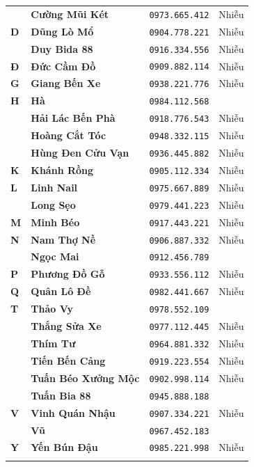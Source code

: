 \documentclass[12pt,a4paper]{article}
\begin{document}
\begin{xltabular}{\textwidth}{>{\hsize}X >{\hsize}X >{\hsize}X >{\hsize}X}
 & \textbf{Cường Mũi Két} & \texttt{0973.665.412} & Nhiễu \\ \addlinespace[4pt]
\textbf{D} & \textbf{Dũng Lò Mổ} & \texttt{0904.778.221} & Nhiễu \\ \addlinespace[4pt]
 & \textbf{Duy Bida 88} & \texttt{0916.334.556} & Nhiễu \\ \addlinespace[4pt]
\textbf{Đ} & \textbf{Đức Cầm Đồ} & \texttt{0909.882.114} & Nhiễu \\ \addlinespace[4pt]
\textbf{G} & \textbf{Giang Bến Xe} & \texttt{0938.221.776} & Nhiễu \\ \addlinespace[4pt]
\textbf{H} & \textbf{Hà} & \texttt{0984.112.568} &  \\ \addlinespace[4pt]
 & \textbf{Hải Lác Bến Phà} & \texttt{0918.776.543} & Nhiễu \\ \addlinespace[4pt]
 & \textbf{Hoàng Cắt Tóc} & \texttt{0948.332.115} & Nhiễu \\ \addlinespace[4pt]
 & \textbf{Hùng Đen Cửu Vạn} & \texttt{0936.445.882} & Nhiễu \\ \addlinespace[4pt]
\textbf{K} & \textbf{Khánh Rồng} & \texttt{0905.112.334} & Nhiễu \\ \addlinespace[4pt]
\textbf{L} & \textbf{Linh Nail} & \texttt{0975.667.889} & Nhiễu \\ \addlinespace[4pt]
 & \textbf{Long Sẹo} & \texttt{0979.441.223} & Nhiễu \\ \addlinespace[4pt]
\textbf{M} & \textbf{Minh Béo} & \texttt{0917.443.221} & Nhiễu \\ \addlinespace[4pt]
\textbf{N} & \textbf{Nam Thợ Nề} & \texttt{0906.887.332} & Nhiễu \\ \addlinespace[4pt]
 & \textbf{Ngọc Mai} & \texttt{0912.456.789} &  \\ \addlinespace[4pt]
\textbf{P} & \textbf{Phương Đồ Gỗ} & \texttt{0933.556.112} & Nhiễu \\ \addlinespace[4pt]
\textbf{Q} & \textbf{Quân Lô Đề} & \texttt{0982.441.667} & Nhiễu \\ \addlinespace[4pt]
\textbf{T} & \textbf{Thảo Vy} & \texttt{0978.552.109} &  \\ \addlinespace[4pt]
 & \textbf{Thắng Sửa Xe} & \texttt{0977.112.445} & Nhiễu \\ \addlinespace[4pt]
 & \textbf{Thím Tư} & \texttt{0964.881.332} & Nhiễu \\ \addlinespace[4pt]
 & \textbf{Tiến Bến Cảng} & \texttt{0919.223.554} & Nhiễu \\ \addlinespace[4pt]
 & \textbf{Tuấn Béo Xưởng Mộc} & \texttt{0902.998.114} & Nhiễu \\ \addlinespace[4pt]
 & \textbf{Tuấn Bia 88} & \texttt{0945.888.188} &  \\ \addlinespace[4pt]
\textbf{V} & \textbf{Vinh Quán Nhậu} & \texttt{0907.334.221} & Nhiễu \\ \addlinespace[4pt]
 & \textbf{Vũ} & \texttt{0967.452.183} &  \\ \addlinespace[4pt]
\textbf{Y} & \textbf{Yến Bún Đậu} & \texttt{0985.221.998} & Nhiễu \\ \addlinespace[4pt]
\end{xltabular}
\endgroup
\end{document}
